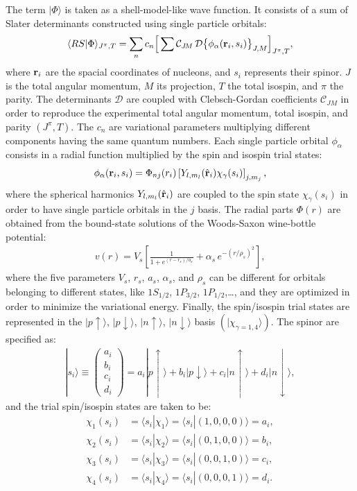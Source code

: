 \documentclass[aps,prc,twocolumn,superscriptaddress,floatfix]{revtex4-1}
\begin{document}
The term $|\Phi\rangle$ is taken as a shell-model-like wave function. 
It consists of a sum of Slater determinants constructed using single particle orbitals:
\begin{align} 
\langle RS|\Phi\rangle_{J^\pi,T} = \sum_n c_n\Big[\sum \mathcal C_{J\!M}\,\mathcal D\big\{\phi_\alpha(\vb{r}_i,s_i)\big\}_{J,M}\Big]_{J^\pi,T} ,
\end{align}
where $\vb{r}_i$ are the spacial coordinates of nucleons, and $s_i$ represents their spinor.
$J$ is the total angular momentum, $M$ its projection, $T$ the total isospin, and $\pi$ the parity.
The determinants $\mathcal D$ are coupled with Clebsch-Gordan coefficients $\mathcal C_{J\!M}$ 
in order to reproduce the experimental total angular momentum, total isospin, and parity $(J^\pi,T)$. 
The $c_n$ are variational parameters multiplying different components having the same quantum numbers. 
Each single particle orbital $\phi_\alpha$ consists in a radial function multiplied by the spin and
isospin trial states:
\begin{align}
\phi_\alpha(\vb{r}_i,s_i)=\Phi_{nj}(r_i)\left[Y_{l,m_l}(\hat{\vb{r}}_i)\chi_\gamma(s_i)\right]_{j,m_j} ,
\label{eq:phi}
\end{align}
where the spherical harmonics $Y_{l,m_l}(\hat{\vb{r}}_i)$ are coupled to the spin state $\chi_\gamma(s_i)$
in order to have single particle orbitals in the $j$ basis.
The radial parts $\Phi(r)$ are obtained from the bound-state solutions of the Woods-Saxon 
wine-bottle potential:
\begin{align}
v(r)=V_s\left[\frac{1}{1+e^{(r-r_s)/a_s}}+\alpha_s\,e^{-(r/{\rho_s})^2}\right] ,
\end{align}
where the five parameters $V_s$, $r_s$, $a_s$, $\alpha_s$, and $\rho_s$ can be different for orbitals
belonging to different states, like $1S_{1/2}$, $1P_{3/2}$, $1P_{1/2}$,\ldots, and they are 
optimized in order to minimize the variational energy.
Finally, the spin/isospin trial states are represented in the $|p\uparrow\rangle$, $|p\downarrow\rangle$,
$|n\uparrow\rangle$, $|n\downarrow\rangle$ basis $(|\chi_{\gamma=1,4}\rangle)$. 
The spinor are specified as:
\begin{align}
|s_i\rangle \equiv \left(\begin{array}{c} 
a_i \\ b_i \\ c_i \\ d_i
\end{array}\right)
=a_i|p\uparrow\rangle+b_i|p\downarrow\rangle+c_i|n\uparrow\rangle+d_i|n\downarrow\rangle ,
\end{align}
and the trial spin/isospin states are taken to be:
\begin{align}
\chi_1(s_i)&=\langle s_i|\chi_1\rangle=\langle s_i|(1,0,0,0)\rangle=a_i,\nonumber \\
\chi_2(s_i)&=\langle s_i|\chi_2\rangle=\langle s_i|(0,1,0,0)\rangle=b_i,\nonumber \\
\chi_3(s_i)&=\langle s_i|\chi_3\rangle=\langle s_i|(0,0,1,0)\rangle=c_i,\nonumber \\
\chi_4(s_i)&=\langle s_i|\chi_4\rangle=\langle s_i|(0,0,0,1)\rangle=d_i .
\end{align}
\end{document}
